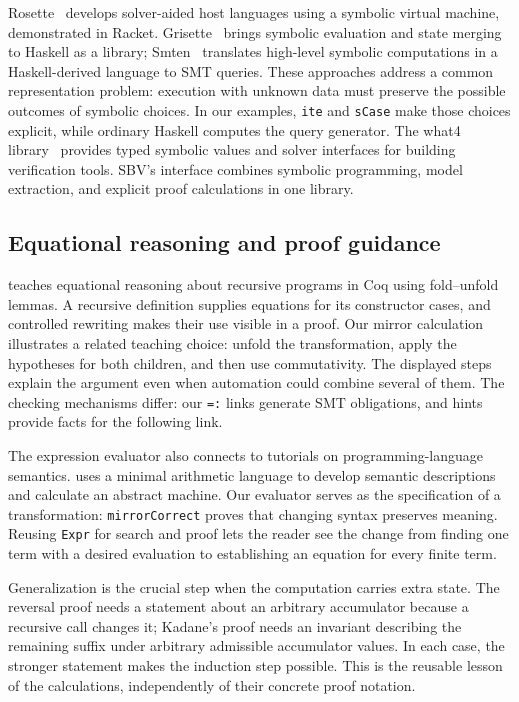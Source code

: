 \documentclass[review]{jfp-epi}
\newcommand{\code}[1]{\texttt{#1}}
\begin{document}
Rosette~\citep{rosette} develops solver-aided host languages using a symbolic
virtual machine, demonstrated in Racket. Grisette~\citep{grisette} brings
symbolic evaluation and state merging to Haskell as a library;
Smten~\citep{smten} translates high-level symbolic computations in a
Haskell-derived language to SMT queries. These approaches address a common
representation problem: execution with unknown data must preserve the possible
outcomes of symbolic choices. In our examples, \code{ite} and \code{sCase}
make those choices explicit, while ordinary Haskell computes the query generator.
The what4 library~\citep{what4} provides typed symbolic values and solver
interfaces for building verification tools. SBV's interface combines symbolic
programming, model extraction, and explicit proof calculations in one library.

\subsection{Equational reasoning and proof guidance}
\label{sec:related-calculation}

\citet{danvyfoldunfold} teaches equational reasoning about recursive programs in
Coq using fold--unfold lemmas. A recursive definition supplies equations for its
constructor cases, and controlled rewriting makes their use visible in a proof.
Our mirror calculation illustrates a related teaching choice: unfold the
transformation, apply the hypotheses for both children, and then use
commutativity. The displayed steps explain the argument even when automation
could combine several of them. The checking mechanisms differ: our \code{=:}
links generate SMT obligations, and hints provide facts for the following link.

The expression evaluator also connects to tutorials on programming-language
semantics. \citet{huttonsemantics} uses a minimal arithmetic language to develop
semantic descriptions and calculate an abstract machine. Our evaluator serves
as the specification of a transformation: \code{mirrorCorrect} proves that
changing syntax preserves meaning. Reusing \code{Expr} for search and proof
lets the reader see the change from finding one term with a desired evaluation
to establishing an equation for every finite term.

Generalization is the crucial step when the computation carries extra state.
The reversal proof needs a statement about an arbitrary accumulator because a
recursive call changes it; Kadane's proof needs an invariant describing the
remaining suffix under arbitrary admissible accumulator values. In each case,
the stronger statement makes the induction step possible. This is the reusable
lesson of the calculations, independently of their concrete proof notation.
\end{document}
